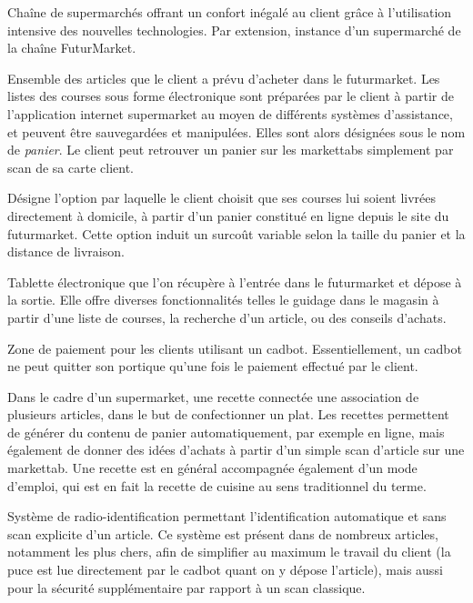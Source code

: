 Chaîne de supermarchés offrant un confort inégalé au client grâce à l'utilisation intensive des nouvelles technologies.
Par extension, instance d'un supermarché de la chaîne FuturMarket.
\par

Ensemble des articles que le client a prévu d'acheter dans le futurmarket.
Les listes des courses sous forme électronique sont préparées par le client à partir de l'application internet supermarket au moyen de différents systèmes d'assistance, et peuvent être sauvegardées et manipulées. 
Elles sont alors désignées sous le nom de {\em panier}.
Le client peut retrouver un panier sur les markettabs simplement par scan de sa carte client.
\par

Désigne l'option par laquelle le client choisit que ses courses lui soient livrées directement à domicile, à partir d'un panier constitué en ligne depuis le site du futurmarket.
Cette option induit un surcoût variable selon la taille du panier et la distance de livraison.
\par

Tablette électronique que l'on récupère à l'entrée dans le futurmarket et dépose à la sortie.
Elle offre diverses fonctionnalités telles le guidage dans le magasin à partir d'une liste de courses, la recherche d'un article, ou des conseils d'achats.
\par

Zone de paiement pour les clients utilisant un cadbot.
Essentiellement, un cadbot ne peut quitter son portique qu'une fois le paiement effectué par le client.
\par

Dans le cadre d'un supermarket, une recette connectée une association de plusieurs articles, dans le but de confectionner un plat. 
Les recettes permettent de générer du contenu de panier automatiquement, par exemple en ligne, mais également de donner des idées d'achats à partir d'un simple scan d'article sur une markettab.
Une recette est en général accompagnée également d'un mode d'emploi, qui est en fait la recette de cuisine au sens traditionnel du terme.
\par 

Système de radio-identification permettant l'identification automatique et sans scan explicite d'un article.
Ce système est présent dans de nombreux articles, notamment les plus chers, afin de simplifier au maximum le travail du client (la puce est lue directement par le cadbot quant on y dépose l'article), mais aussi pour la sécurité supplémentaire par rapport à un scan classique.
\par

